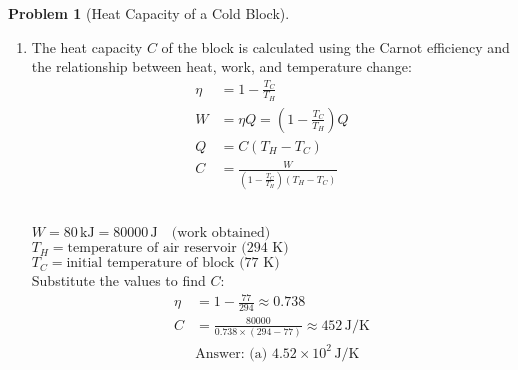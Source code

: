 \documentclass[12pt]{article}
\theoremstyle{definition} %
\newtheorem{problem}{Problem}
\theoremstyle{plain} %
\begin{document}
\begin{problem}[Heat Capacity of a Cold Block]
    \noindent
    \begin{enumerate}
        \item 
        The heat capacity \( C \) of the block is calculated using the Carnot efficiency and the relationship between heat, work, and temperature change:
        \begin{align*}
        \eta &= 1 - \frac{T_C}{T_H} \\
        W &= \eta Q = \left(1 - \frac{T_C}{T_H}\right) Q \\
        Q &= C (T_H - T_C) \\
        C &= \frac{W}{\left(1 - \frac{T_C}{T_H}\right)(T_H - T_C)}
        \end{align*}
        
         \\
        \( W = 80 \, \text{kJ} = 80000 \, \text{J} \quad \text{(work obtained)} \) \\
        \( T_H = \text{temperature of air reservoir (294 K)} \) \\
        \( T_C = \text{initial temperature of block (77 K)} \) \\

        Substitute the values to find \( C \):
        \begin{align*}
        \eta &= 1 - \frac{77}{294} \approx 0.738 \\
        C &= \frac{80000}{0.738 \times (294 - 77)} \approx 452 \, \text{J/K} \\
        &\text{Answer: (a) } 4.52 \times 10^2 \, \text{J/K}
        \end{align*}
    \end{enumerate}
\end{problem}
\end{document}
